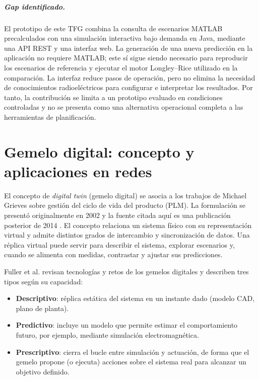 \subparagraph{Gap identificado.} El prototipo de este TFG combina la consulta de escenarios MATLAB precalculados con una
simulación interactiva bajo demanda en Java, mediante una API REST y una interfaz web. La
generación de una nueva predicción en la aplicación no requiere MATLAB; este sí sigue siendo
necesario para reproducir los escenarios de referencia y ejecutar el motor Longley--Rice
utilizado en la comparación. La interfaz reduce pasos de operación, pero no elimina la
necesidad de conocimientos radioeléctricos para configurar e interpretar los resultados.
Por tanto, la contribución se limita a un prototipo evaluado en condiciones controladas y no
se presenta como una alternativa operacional completa a las herramientas de planificación.

\section{Gemelo digital: concepto y aplicaciones en redes}
\label{sec:gemelo}

El concepto de \textit{digital twin} (gemelo digital) se asocia a los trabajos de Michael
Grieves sobre gestión del ciclo de vida del producto (PLM). La formulación se presentó
originalmente en 2002 y la fuente citada aquí es una publicación posterior de 2014
\cite{grieves2014digital}. El concepto relaciona un sistema físico con su representación
virtual y admite distintos grados de intercambio y sincronización de datos. Una réplica
virtual puede servir para describir el sistema, explorar escenarios y, cuando se alimenta
con medidas, contrastar y ajustar sus predicciones.

Fuller et al. \cite{fuller2020digital} revisan tecnologías y retos de los gemelos digitales
y describen tres tipos según su capacidad:
\begin{itemize}
  \item \textbf{Descriptivo}: réplica estática del sistema en un instante dado
    (modelo CAD, plano de planta).
  \item \textbf{Predictivo}: incluye un modelo que permite estimar el comportamiento
    futuro, por ejemplo, mediante simulación electromagnética.
  \item \textbf{Prescriptivo}: cierra el bucle entre simulación y actuación, de forma
    que el gemelo propone (o ejecuta) acciones sobre el sistema real para alcanzar un
    objetivo definido.
\end{itemize}

